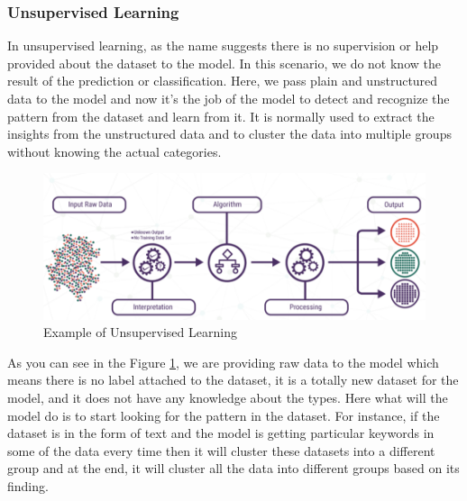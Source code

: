 \subsubsection{Unsupervised Learning}
\par
In unsupervised learning, as the name suggests there is no supervision or help provided about the dataset to the model. In this scenario, we do not know the result of the prediction or classification. Here, we pass plain and unstructured data to the model and now it's the job of the model to detect and recognize the pattern from the dataset and learn from it. It is normally used to extract the insights from the unstructured data and to cluster the data into multiple groups without knowing the actual categories.
\begin{figure}[H]
\centering
\includegraphics[scale=0.7]{images/Chapter2/unsupervised-learning.PNG}
\caption{Example of Unsupervised Learning \cite{sup_unsup_learning}}
\label{ex-ul}
\end{figure}
\par
As you can see in the Figure \ref{ex-ul}, we are providing raw data to the model which means there is no label attached to the dataset, it is a totally new dataset for the model, and it does not have any knowledge about the types. Here what will the model do is to start looking for the pattern in the dataset. For instance, if the dataset is in the form of text and the model is getting particular keywords in some of the data every time then it will cluster these datasets into a different group and at the end, it will cluster all the data into different groups based on its finding.
